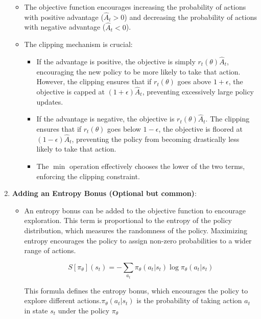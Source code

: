 \documentclass[10pt,a4paper]{report}
\begin{document}
\begin{enumerate}
\begin{itemize}
\item         The objective function encourages increasing the probability of actions with positive advantage ($\hat{A}_t > 0$) and decreasing the probability of actions with negative advantage ($\hat{A}_t < 0$).

\item         The clipping mechanism is crucial:
\begin{itemize}
 \item           If the advantage is positive, the objective is simply $r_t(\theta) \hat{A}_t$, encouraging the new policy to be more likely to take that action. However, the clipping ensures that if $r_t(\theta)$ goes above $1+\epsilon$, the objective is capped at $(1+\epsilon) \hat{A}_t$, preventing excessively large policy updates.
\item            If the advantage is negative, the objective is $r_t(\theta) \hat{A}_t$. The clipping ensures that if $r_t(\theta)$ goes below $1-\epsilon$, the objective is floored at $(1-\epsilon) \hat{A}_t$, preventing the policy from becoming drastically less likely to take that action.
\item            The $\min$ operation effectively chooses the lower of the two terms, enforcing the clipping constraint.
\end{itemize}
\end{itemize}

\item    \textbf{Adding an Entropy Bonus (Optional but common)}:
\begin{itemize}
\item         An entropy bonus can be added to the objective function to encourage exploration. This term is proportional to the entropy of the policy distribution, which measures the randomness of the policy. Maximizing entropy encourages the policy to assign non-zero probabilities to a wider range of actions.

$$S[\pi_\theta](s_t) = -\sum_{a_t} \pi_\theta(a_t | s_t) \log \pi_\theta(a_t | s_t)$$

This formula defines the entropy bonus, which encourages the policy to explore different actions.$\pi_\theta(a_t | s_t)$ is the probability of taking action $a_t$ in state $s_t$ under the policy $\pi_\theta$


\end{itemize}
\end{enumerate}
\end{document}
